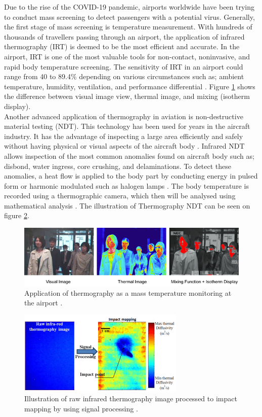 \noindent Due to the rise of the COVID-19 pandemic, airports worldwide have been trying to conduct mass screening to detect passengers with a potential virus. Generally, the first stage of mass screening is temperature measurement. With hundreds of thousands of travellers passing through an airport, the application of infrared thermography (IRT) is deemed to be the most efficient and accurate. In the airport, IRT is one of the most valuable tools for non-contact, noninvasive, and rapid body temperature screening.  The sensitivity of IRT in an airport could range from 40 to 89.4\% depending on various circumstances such as; ambient temperature, humidity, ventilation, and performance differential \cite{Sun2017ApplicationsStations}. Figure \ref{fig:airport_IR} shows the difference between visual image view, thermal image, and mixing (isotherm display).\\

\noindent Another advanced application of thermography in aviation is non-destructive material testing (NDT). This technology has been used for years in the aircraft industry. It has the advantage of inspecting a large area efficiently and safely without having physical or visual aspects of the aircraft body \cite{Ibarra-CastanedoInfraredMaterials}. Infrared NDT allows inspection of the most common anomalies found on aircraft body such as; disbond, water ingress, core crushing, and delaminations. To detect these anomalies, a heat flow is applied to the body part by conducting energy in pulsed form or harmonic modulated such as halogen lamps \cite{Stumper2015ThermalAviation}. The body temperature is recorded using a thermographic camera, which then will be analysed using mathematical analysis \cite{Anonymous2013InformationImprovement}. The illustration of Thermography NDT can be seen on figure \ref{fig:ndt_av}. \\

\begin{figure}[!ht]
    \centering
    \includegraphics[scale=0.65]{Figures/IR_airport.jpg}
    \caption{Application of thermography as a mass temperature monitoring at the airport \cite{AnonymousBodyCO.LTD.}.}
    \label{fig:airport_IR}
\end{figure}

\begin{figure}[!ht]
    \centering
    \includegraphics[scale=1.2]{Figures/IR_NDT.png}
    \caption{Illustration of raw infrared thermography image processed to impact mapping by using signal processing \cite{Non-destructiveLab}.}
    \label{fig:ndt_av}
\end{figure}
 